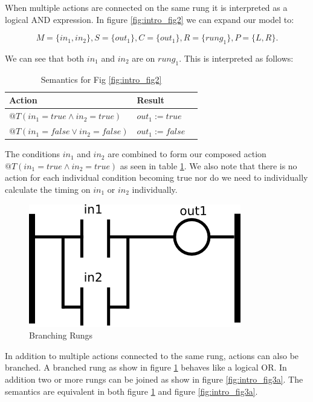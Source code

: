 When multiple actions are connected on the same rung it is interpreted as a logical AND 
expression. In figure \ref{fig:intro_fig2} we can expand our model to:

$$M=\lbrace in_1, in_2 \rbrace, S=\lbrace out_1 \rbrace, C=\lbrace out_1 \rbrace, R=\lbrace rung_1 \rbrace, P=\lbrace L,R \rbrace.$$

We can see that both $in_1$ and $in_2$ are on $rung_1$. This is interpreted as follows:

\begin{table}[htp]
    \centering
       \begin{tabular}{|l|l|l|}
        \hline
        Action & Result \\
        \hline
        $@T(in_1 = true \wedge in_2 = true)$ & $out_1 := true$ \\
        \hline
        $@T(in_1 = false \vee in_2 = false)$ & $out_1 := false$ \\
        \hline
    \end{tabular}
    \caption{Semantics for Fig \ref{fig:intro_fig2}}
    \label{table:table_for_fig2}
\end{table}

The conditions $in_1$ and $in_2$ are combined to form our composed action $@T(in_1 = true \wedge in_2 = true)$ 
as seen in table \ref{table:table_for_fig2}. We also note that there is no action for each individual condition
becoming true nor do we need to individually calculate the timing on $in_1$ or $in_2$ individually.

\begin{figure}[htp]
    \centering
    \includegraphics[width=\imgsmall]{./images/intro_fig3.png}
    \caption{Branching Rungs}
    \label{fig:intro_fig3}
\end{figure}


In addition to multiple actions connected to the same rung, actions can also be branched. A branched rung as
show in figure \ref{fig:intro_fig3} behaves like a logical OR. In addition two or more rungs can be joined
as show in figure \ref{fig:intro_fig3a}. The semantics are equivalent in both figure \ref{fig:intro_fig3} and 
figure \ref{fig:intro_fig3a}.

